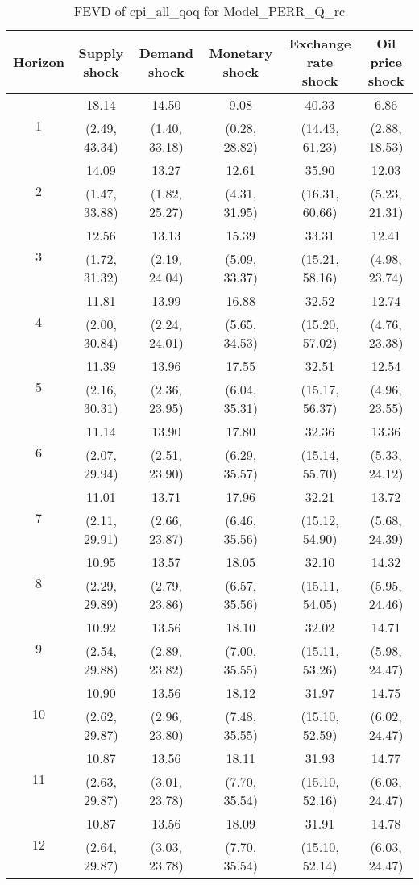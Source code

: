\documentclass{article}
\begin{document}
\begin{table}
	\footnotesize
	\caption{FEVD of cpi_all_qoq for Model_PERR_Q_rc}
	\begin{tabular}{cccccc}
		Horizon & Supply shock & Demand shock & Monetary shock & Exchange rate shock & Oil price shock\\ \hline
		\multirow{2}{*}{1} & 18.14 & 14.50 & 9.08 & 40.33 & 6.86\\
		 & (2.49, 43.34) & (1.40, 33.18) & (0.28, 28.82) & (14.43, 61.23) & (2.88, 18.53)\\
		\multirow{2}{*}{2} & 14.09 & 13.27 & 12.61 & 35.90 & 12.03\\
		 & (1.47, 33.88) & (1.82, 25.27) & (4.31, 31.95) & (16.31, 60.66) & (5.23, 21.31)\\
		\multirow{2}{*}{3} & 12.56 & 13.13 & 15.39 & 33.31 & 12.41\\
		 & (1.72, 31.32) & (2.19, 24.04) & (5.09, 33.37) & (15.21, 58.16) & (4.98, 23.74)\\
		\multirow{2}{*}{4} & 11.81 & 13.99 & 16.88 & 32.52 & 12.74\\
		 & (2.00, 30.84) & (2.24, 24.01) & (5.65, 34.53) & (15.20, 57.02) & (4.76, 23.38)\\
		\multirow{2}{*}{5} & 11.39 & 13.96 & 17.55 & 32.51 & 12.54\\
		 & (2.16, 30.31) & (2.36, 23.95) & (6.04, 35.31) & (15.17, 56.37) & (4.96, 23.55)\\
		\multirow{2}{*}{6} & 11.14 & 13.90 & 17.80 & 32.36 & 13.36\\
		 & (2.07, 29.94) & (2.51, 23.90) & (6.29, 35.57) & (15.14, 55.70) & (5.33, 24.12)\\
		\multirow{2}{*}{7} & 11.01 & 13.71 & 17.96 & 32.21 & 13.72\\
		 & (2.11, 29.91) & (2.66, 23.87) & (6.46, 35.56) & (15.12, 54.90) & (5.68, 24.39)\\
		\multirow{2}{*}{8} & 10.95 & 13.57 & 18.05 & 32.10 & 14.32\\
		 & (2.29, 29.89) & (2.79, 23.86) & (6.57, 35.56) & (15.11, 54.05) & (5.95, 24.46)\\
		\multirow{2}{*}{9} & 10.92 & 13.56 & 18.10 & 32.02 & 14.71\\
		 & (2.54, 29.88) & (2.89, 23.82) & (7.00, 35.55) & (15.11, 53.26) & (5.98, 24.47)\\
		\multirow{2}{*}{10} & 10.90 & 13.56 & 18.12 & 31.97 & 14.75\\
		 & (2.62, 29.87) & (2.96, 23.80) & (7.48, 35.55) & (15.10, 52.59) & (6.02, 24.47)\\
		\multirow{2}{*}{11} & 10.87 & 13.56 & 18.11 & 31.93 & 14.77\\
		 & (2.63, 29.87) & (3.01, 23.78) & (7.70, 35.54) & (15.10, 52.16) & (6.03, 24.47)\\
		\multirow{2}{*}{12} & 10.87 & 13.56 & 18.09 & 31.91 & 14.78\\
		 & (2.64, 29.87) & (3.03, 23.78) & (7.70, 35.54) & (15.10, 52.14) & (6.03, 24.47)\\
	\end{tabular}
\label{tab:fevd-Model_PERR_Q_rc-cpi_all_qoq}
\end{table}
\end{document}
